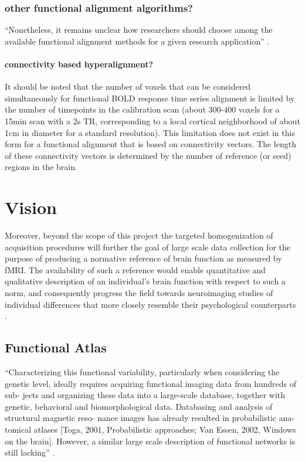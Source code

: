 \subsubsection{other functional alignment algorithms?}

``Nonetheless, it remains unclear how researchers should choose among the
available functional alignment methods for a given research application''
\citep{bazeille2021empirical}.

\paragraph{connectivity based hyperalignment?}
%
It should be noted that the number of voxels that can be considered
simultaneously for functional BOLD response time series alignment is limited by
the number of timepoints in the calibration scan (about 300-400 voxels for a
15min scan with a 2s TR, corresponding to a local cortical neighborhood of about
1cm in diameter for a standard resolution).
%
This limitation does not exist in this form for a functional alignment that is
based on connectivity vectors.
%
The length of these connectivity vectors is determined by the number of
reference (or seed) regions in the brain.


\section{Vision}


%
Moreover, beyond the scope of this project the targeted homogenization of
acquisition procedures will further the goal of large scale data collection for
the purpose of producing a normative reference of brain function as measured by
fMRI.
%
The availability of such a reference would enable quantitative and qualitative
description of an individual's brain function with respect to such a norm, and
consequently progress the field towards neuroimaging studies of individual
differences that more closely resemble their psychological counterparts
\citep{dubois2016building}.

\subsection{Functional Atlas}

``Characterizing this functional variability, particularly when considering the
genetic level, ideally requires acquiring functional imaging data from hundreds
of sub- jects and organizing these data into a large-scale database, together
with genetic, behavioral and biomorphological data. Databasing and analysis of
structural magnetic reso- nance images has already resulted in probabilistic
ana- tomical atlases [Toga, 2001, Probabilistic approaches; Van Essen, 2002,
Windows on the brain]. However, a similar large scale description of
functional networks is still lacking'' \citep{pinel2007fast}.

